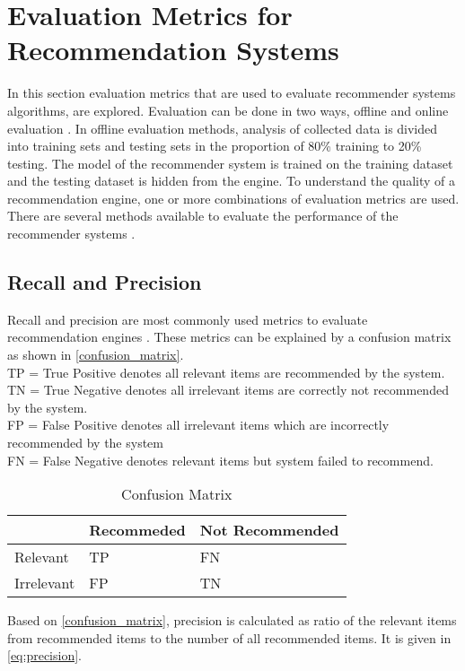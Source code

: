 
\section{Evaluation Metrics for Recommendation Systems}
\label{sec:eval_metrics}

In this section evaluation metrics that are used to evaluate recommender systems algorithms, are explored. Evaluation can be done in two ways, offline and online evaluation \cite{22,23}. In offline evaluation methods, analysis of collected data is divided into training sets and testing sets in the proportion of 80\% training to 20\% testing. The model of the recommender system is trained on the training dataset and the testing dataset is hidden from the engine. To understand the quality of a recommendation engine, one or more combinations of evaluation metrics are used. There are several methods available to evaluate the performance of the recommender systems \cite{22,24}.
  
\subsection{Recall and Precision}
\label{sec:recall_precision}
Recall and precision are most commonly used metrics to evaluate recommendation engines \cite{25}. These metrics can be explained by a confusion matrix \cite{21} as shown in \autoref{confusion_matrix}. \\
\noindent
TP = True Positive denotes all relevant items are recommended by the system.\\
TN = True Negative denotes all irrelevant items are correctly not recommended by the system.  \\
FP = False Positive denotes all irrelevant items which are
incorrectly recommended by the system\\
FN = False Negative denotes relevant items but system failed to recommend.\\

\begin{table}[]
\centering 
\begin{tabular}{|l|l|l|}
\hline
\rowcolor[HTML]{C0C0C0} 
\textbf{}  & \textbf{Recommeded} & \textbf{Not Recommended} \\ \hline
Relevant   & TP                  & FN                       \\ \hline
Irrelevant & FP                  & TN                       \\ \hline
\end{tabular}
\caption{Confusion Matrix \cite{21}}
\label{confusion_matrix}
\end{table}
\noindent Based on \autoref{confusion_matrix}, precision is calculated as ratio of the relevant items from recommended items to the number of all recommended items. It is given in \autoref{eq:precision}. 

